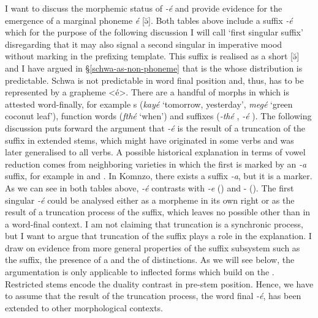 I want to discuss the morphemic status of \emph{-é} and provide evidence for the emergence of a marginal phoneme \emph{é} [ə̆]. Both tables above include a suffix \emph{-é} which for the purpose of the following discussion I will call `first  singular suffix' disregarding that it may also signal a second singular in imperative mood without  marking in the prefixing template. This suffix is realised as a short  [ə̆] and I have argued in \S{}\ref{schwa-as-non-phoneme} that  is the  whose distribution is predictable. Schwa is not predictable in word final position and, thus, has to be represented by a grapheme <é>. There are a handful of morphs in which  is attested word-finally, for example s (\emph{kayé} `tomorrow, yesterday', \emph{megé} `green coconut leaf'), function words (\emph{fthé} `when') and suffixes (\emph{-thé} \Adlzr{}, \emph{-é} \Fsg{}). The following discussion puts forward the argument that \emph{-é} is the result of a truncation of the  suffix in extended stems, which might have originated in some verbs and was later generalised to all verbs. A possible historical explanation in terms of vowel reduction comes from neighboring varieties in which the first  is marked by an \emph{-a} suffix, for example in  and . In Komnzo, there exists a suffix \emph{-a}, but it is a  marker.\\

As we can see in both tables above, \emph{-é} contrasts with \emph{-e} (\Fnsg) and -\Zero{} (\Stsg). The first singular \emph{-é} could be analysed either as a morpheme in its own right or as the result of a truncation process of the  suffix, which leaves no possible  other than  in a word-final context. I am not claiming that truncation is a synchronic process, but I want to argue that truncation of the  suffix plays a role in the explanation. I draw on evidence from more general properties of the suffix subsystem such as the  suffix, the presence of a  and the  of  distinctions. As we will see below, the argumentation is only applicable to inflected forms which build on the . Restricted stems encode the duality contrast in pre-stem position. Hence, we have to assume that the result of the truncation process, the word final  \emph{-é}, has been extended to other morphological contexts.\\

